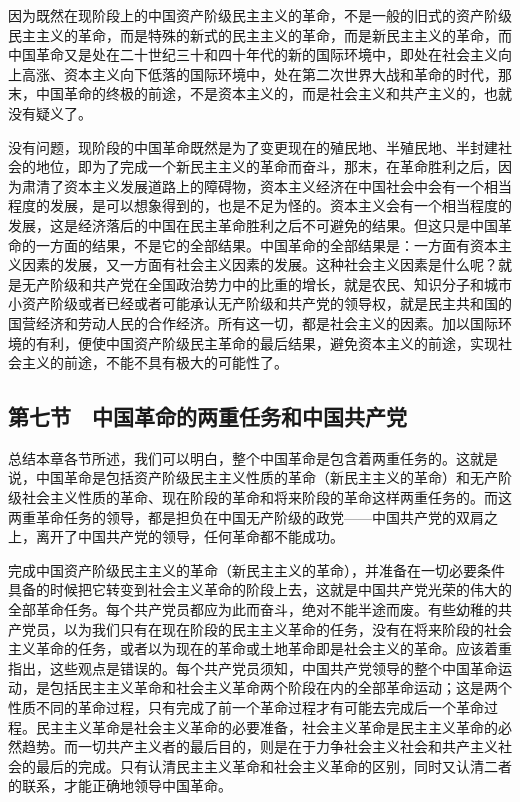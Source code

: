 因为既然在现阶段上的中国资产阶级民主主义的革命，不是一般的旧式的资产阶级民主主义的革命，而是特殊的新式的民主主义的革命，而是新民主主义的革命，而中国革命又是处在二十世纪三十和四十年代的新的国际环境中，即处在社会主义向上高涨、资本主义向下低落的国际环境中，处在第二次世界大战和革命的时代，那末，中国革命的终极的前途，不是资本主义的，而是社会主义和共产主义的，也就没有疑义了。

没有问题，现阶段的中国革命既然是为了变更现在的殖民地、半殖民地、半封建社会的地位，即为了完成一个新民主主义的革命而奋斗，那末，在革命胜利之后，因为肃清了资本主义发展道路上的障碍物，资本主义经济在中国社会中会有一个相当程度的发展，是可以想象得到的，也是不足为怪的。资本主义会有一个相当程度的发展，这是经济落后的中国在民主革命胜利之后不可避免的结果。但这只是中国革命的一方面的结果，不是它的全部结果。中国革命的全部结果是：一方面有资本主义因素的发展，又一方面有社会主义因素的发展。这种社会主义因素是什么呢？就是无产阶级和共产党在全国政治势力中的比重的增长，就是农民、知识分子和城市小资产阶级或者已经或者可能承认无产阶级和共产党的领导权，就是民主共和国的国营经济和劳动人民的合作经济。所有这一切，都是社会主义的因素。加以国际环境的有利，便使中国资产阶级民主革命的最后结果，避免资本主义的前途，实现社会主义的前途，不能不具有极大的可能性了。

\subsection{第七节　中国革命的两重任务和中国共产党}

总结本章各节所述，我们可以明白，整个中国革命是包含着两重任务的。这就是说，中国革命是包括资产阶级民主主义性质的革命（新民主主义的革命）和无产阶级社会主义性质的革命、现在阶段的革命和将来阶段的革命这样两重任务的。而这两重革命任务的领导，都是担负在中国无产阶级的政党——中国共产党的双肩之上，离开了中国共产党的领导，任何革命都不能成功。

完成中国资产阶级民主主义的革命（新民主主义的革命），并准备在一切必要条件具备的时候把它转变到社会主义革命的阶段上去，这就是中国共产党光荣的伟大的全部革命任务。每个共产党员都应为此而奋斗，绝对不能半途而废。有些幼稚的共产党员，以为我们只有在现在阶段的民主主义革命的任务，没有在将来阶段的社会主义革命的任务，或者以为现在的革命或土地革命即是社会主义的革命。应该着重指出，这些观点是错误的。每个共产党员须知，中国共产党领导的整个中国革命运动，是包括民主主义革命和社会主义革命两个阶段在内的全部革命运动；这是两个性质不同的革命过程，只有完成了前一个革命过程才有可能去完成后一个革命过程。民主主义革命是社会主义革命的必要准备，社会主义革命是民主主义革命的必然趋势。而一切共产主义者的最后目的，则是在于力争社会主义社会和共产主义社会的最后的完成。只有认清民主主义革命和社会主义革命的区别，同时又认清二者的联系，才能正确地领导中国革命。

